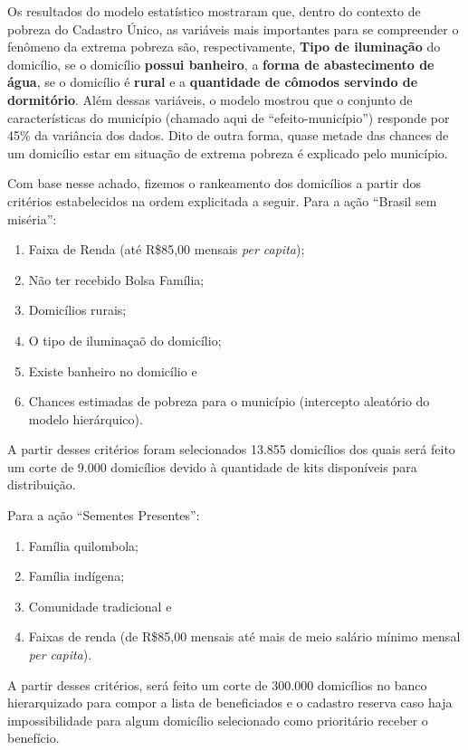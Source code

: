 \documentclass[a4paper, 12pt, openright, oneside, english, brazil, article]{abntex2}
\begin{document}
	Os resultados do modelo estatístico mostraram que, dentro do contexto de pobreza do Cadastro Único, as variáveis mais importantes para se compreender o fenômeno da extrema pobreza são, respectivamente, \textbf{Tipo de iluminação} do domicílio, se o domicílio \textbf{possui banheiro}, a \textbf{forma de abastecimento de água}, se o domicílio é \textbf{rural} e a \textbf{quantidade de cômodos servindo de dormitório}. Além dessas variáveis, o modelo mostrou que o conjunto de características do município (chamado aqui de ``efeito-município'') responde por 45\% da variância dos dados. Dito de outra forma, quase metade das chances de um domicílio estar em situação de extrema pobreza é explicado pelo município.
	
	Com base nesse achado, fizemos o rankeamento dos domicílios a partir dos critérios estabelecidos na ordem explicitada a seguir. Para a ação ``Brasil sem miséria'':
	
	\begin{enumerate}
		\item Faixa de Renda (até R\$85,00 mensais \textit{per capita});
		\item Não ter recebido Bolsa Família;
		\item Domicílios rurais;
		\item O tipo de iluminaçaõ do domicílio;
		\item Existe banheiro no domicílio e
		\item Chances estimadas de pobreza para o município (intercepto aleatório do modelo hierárquico).
	\end{enumerate}

	A partir desses critérios foram selecionados 13.855 domicílios dos quais será feito um corte de 9.000 domicílios devido à quantidade de kits disponíveis para distribuição.

	Para a ação ``Sementes Presentes'':
	
	\begin{enumerate}
		\item Família quilombola;
		\item Família indígena;
		\item Comunidade tradicional e 
		\item Faixas de renda (de R\$85,00 mensais até mais de meio salário mínimo mensal \textit{per capita}).
	\end{enumerate}
	
	A partir desses critérios, será feito um corte de 300.000 domicílios no banco hierarquizado para compor a lista de beneficiados e o cadastro reserva caso haja impossibilidade para algum domicílio selecionado como prioritário receber o benefício.
	
\end{document}
